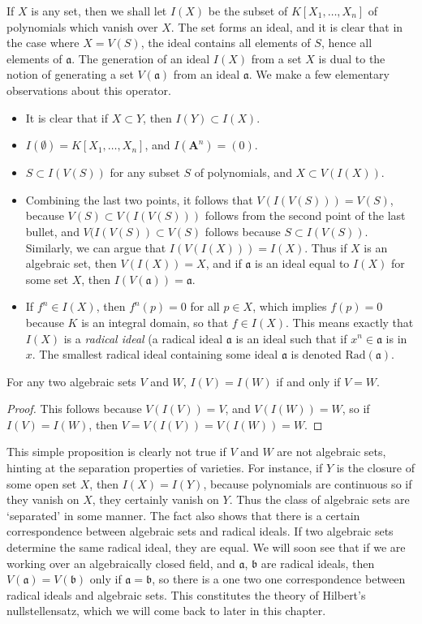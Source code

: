If $X$ is any set, then we shall let $I(X)$ be the subset of $K[X_1, \dots, X_n]$ of polynomials which vanish over $X$. The set forms an ideal, and it is clear that in the case where $X = V(S)$, the ideal contains all elements of $S$, hence all elements of $\mathfrak{a}$. The generation of an ideal $I(X)$ from a set $X$ is dual to the notion of generating a set $V(\mathfrak{a})$ from an ideal $\mathfrak{a}$. We make a few elementary observations about this operator.
%
\begin{itemize}
    \item It is clear that if $X \subset Y$, then $I(Y) \subset I(X)$.
    \item $I(\emptyset) = K[X_1, \dots, X_n]$, and $I(\mathbf{A}^n) = (0)$.
    \item $S \subset I(V(S))$ for any subset $S$ of polynomials, and $X \subset V(I(X))$.
    \item Combining the last two points, it follows that $V(I(V(S))) = V(S)$, because $V(S) \subset V(I(V(S)))$ follows from the second point of the last bullet, and $V(I(V(S)) \subset V(S)$ follows because $S \subset I(V(S))$. Similarly, we can argue that $I(V(I(X))) = I(X)$. Thus if $X$ is an algebraic set, then $V(I(X)) = X$, and if $\mathfrak{a}$ is an ideal equal to $I(X)$ for some set $X$, then $I(V(\mathfrak{a})) = \mathfrak{a}$.
    \item If $f^n \in I(X)$, then $f^n(p) = 0$ for all $p \in X$, which implies $f(p) = 0$ because $K$ is an integral domain, so that $f \in I(X)$. This means exactly that $I(X)$ is a {\it radical ideal} (a radical ideal $\mathfrak{a}$ is an ideal such that if $x^n \in \mathfrak{a}$ is in $x$. The smallest radical ideal containing some ideal $\mathfrak{a}$ is denoted $\text{Rad}(\mathfrak{a})$.
\end{itemize}

\begin{prop}
    For any two algebraic sets $V$ and $W$, $I(V) = I(W)$ if and only if $V = W$.
\end{prop}
\begin{proof}
    This follows because $V(I(V)) = V$, and $V(I(W)) = W$, so if $I(V) = I(W)$, then $V = V(I(V)) = V(I(W)) = W$.
\end{proof}

This simple proposition is clearly not true if $V$ and $W$ are not algebraic sets, hinting at the separation properties of varieties. For instance, if $Y$ is the closure of some open set $X$, then $I(X) = I(Y)$, because polynomials are continuous so if they vanish on $X$, they certainly vanish on $Y$. Thus the class of algebraic sets are `separated' in some manner. The fact also shows that there is a certain correspondence between algebraic sets and radical ideals. If two algebraic sets determine the same radical ideal, they are equal. We will soon see that if we are working over an algebraically closed field, and $\mathfrak{a}$, $\mathfrak{b}$ are radical ideals, then $V(\mathfrak{a}) = V(\mathfrak{b})$ only if $\mathfrak{a} = \mathfrak{b}$, so there is a one two one correspondence between radical ideals and algebraic sets. This constitutes the theory of Hilbert's nullstellensatz, which we will come back to later in this chapter.

